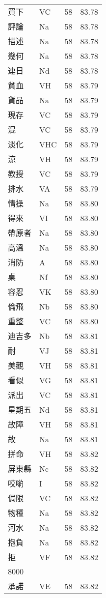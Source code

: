 \documentclass[twocolumn]{book}
\begin{document}
\begin{supertabular}{llrr}
買下 & VC & 58 &  83.78\\
評論 & Na & 58 &  83.78\\
描述 & Na & 58 &  83.78\\
幾何 & Na & 58 &  83.78\\
連日 & Nd & 58 &  83.78\\
貧血 & VH & 58 &  83.79\\
貨品 & Na & 58 &  83.79\\
現存 & VC & 58 &  83.79\\
混 & VC & 58 &  83.79\\
淡化 & VHC & 58 &  83.79\\
涼 & VH & 58 &  83.79\\
教授 & VC & 58 &  83.79\\
排水 & VA & 58 &  83.79\\
情操 & Na & 58 &  83.80\\
得來 & VI & 58 &  83.80\\
帶原者 & Na & 58 &  83.80\\
高溫 & Na & 58 &  83.80\\
消防 & A & 58 &  83.80\\
桌 & Nf & 58 &  83.80\\
容忍 & VK & 58 &  83.80\\
倫飛 & Nb & 58 &  83.80\\
重整 & VC & 58 &  83.80\\
迪吉多 & Nb & 58 &  83.81\\
耐 & VJ & 58 &  83.81\\
美觀 & VH & 58 &  83.81\\
看似 & VG & 58 &  83.81\\
派出 & VC & 58 &  83.81\\
星期五 & Nd & 58 &  83.81\\
故障 & VH & 58 &  83.81\\
故 & Na & 58 &  83.81\\
拼命 & VH & 58 &  83.82\\
屏東縣 & Nc & 58 &  83.82\\
哎喲 & I & 58 &  83.82\\
侷限 & VC & 58 &  83.82\\
物種 & Na & 58 &  83.82\\
河水 & Na & 58 &  83.82\\
抱負 & Na & 58 &  83.82\\
拒 & VF & 58 &  83.82\\
8000\\
承諾 & VE & 58 &  83.82\\

\end{supertabular}
\end{document}
